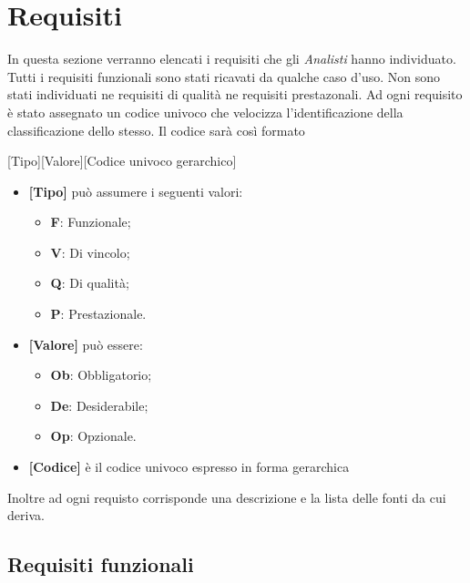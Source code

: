 \section{Requisiti}
In questa sezione verranno elencati i requisiti che gli \textit{Analisti} hanno individuato. 
Tutti i requisiti funzionali sono stati ricavati da qualche caso d'uso.
Non sono stati individuati ne requisiti di qualità ne requisiti prestazonali.
Ad ogni requisito è stato assegnato un codice univoco che velocizza l'identificazione della classificazione dello stesso.
Il codice sarà così formato
\begin{center}
[Tipo][Valore][Codice univoco gerarchico]
\end{center}
\begin{itemize}
\item \textbf{[Tipo]} può assumere i seguenti valori:
\begin{itemize}
	\item \textbf{F}: Funzionale;
	\item \textbf{V}: Di vincolo;
	\item \textbf{Q}: Di qualità;
	\item \textbf{P}: Prestazionale.
\end{itemize}
\item \textbf{[Valore]} può essere:
\begin{itemize}
	\item \textbf{Ob}: Obbligatorio;
	\item \textbf{De}: Desiderabile;
	\item \textbf{Op}: Opzionale.
\end{itemize}
\item \textbf{[Codice]} è il codice univoco espresso in forma gerarchica
\end{itemize}
Inoltre ad ogni requisto corrisponde una descrizione e la lista delle fonti da cui deriva.
\subsection{ Requisiti funzionali}
	
